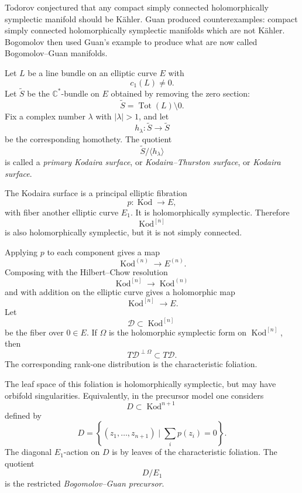 Todorov conjectured that any compact
simply connected holomorphically
symplectic manifold should be
K\"ahler.
Guan produced counterexamples:
compact simply connected
holomorphically symplectic manifolds
which are not K\"ahler.
Bogomolov then used Guan's example to
produce what are now called
Bogomolov--Guan manifolds.

\begin{definition}
\label{definition-let-l2}
Let $L$ be a line bundle on an
elliptic curve $E$ with
\[
c_1(L)\neq 0.
\]
Let $\widetilde S$ be the
$\mathbb{C}^*$-bundle on $E$ obtained
by removing the zero section:
\[
\widetilde S=\operatorname{Tot}(L)
\setminus 0.
\]
Fix a complex number $\lambda$ with
$|\lambda|>1$, and let
\[
h_\lambda:\widetilde S\to\widetilde S
\]
be the corresponding homothety.
The quotient
\[
\widetilde S/\langle h_\lambda\rangle
\]
is called a {\it primary Kodaira
surface}, or {\it Kodaira--Thurston
surface}, or {\it Kodaira surface}.
\end{definition}

\begin{remark}
\label{remark-kodaira-surface}
The Kodaira surface is a principal
elliptic fibration
\[
p:\operatorname{Kod}\to E,
\]
with fiber another elliptic curve
$E_1$.
It is holomorphically symplectic.
Therefore
\[
\operatorname{Kod}^{[n]}
\]
is also holomorphically symplectic,
but it is not simply connected.
\end{remark}

Applying $p$ to each component gives
a map
\[
\operatorname{Kod}^{(n)}\to E^{(n)}.
\]
Composing with the Hilbert--Chow
resolution
\[
\operatorname{Kod}^{[n]}
\to
\operatorname{Kod}^{(n)}
\]
and with addition on the elliptic
curve gives a holomorphic map
\[
\operatorname{Kod}^{[n]}\to E.
\]
Let
\[
\mathcal D\subset \operatorname{Kod}^{[n]}
\]
be the fiber over $0\in E$.
If $\Omega$ is the holomorphic
symplectic form on
$\operatorname{Kod}^{[n]}$, then
\[
T\mathcal D^{\perp\Omega}
\subset
T\mathcal D.
\]
The corresponding rank-one
distribution is the characteristic
foliation.

The leaf space of this foliation is
holomorphically symplectic, but may
have orbifold singularities.
Equivalently, in the precursor model
one considers
\[
D\subset \operatorname{Kod}^{n+1}
\]
defined by
\[
D=
\left\{
(z_1,\ldots,z_{n+1})
\mid
\sum_i p(z_i)=0
\right\}.
\]
The diagonal $E_1$-action on $D$ is
by leaves of the characteristic
foliation.
The quotient
\[
D/E_1
\]
is the restricted
{\it Bogomolov--Guan precursor}.

